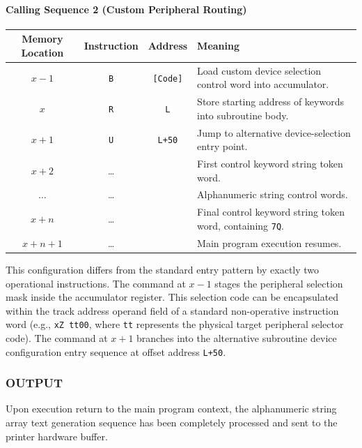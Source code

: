\paragraph{Calling Sequence 2 (Custom Peripheral Routing)}
\begin{table}[h!]
\centering
\begin{tabularx}{\textwidth}{cccX}
\toprule
\textbf{Memory Location} & \textbf{Instruction} & \textbf{Address} & \textbf{Meaning} \\
\midrule
$x-1$   & \texttt{B} & \texttt{[Code]} & Load custom device selection control word into accumulator. \\
$x$     & \texttt{R} & \texttt{L}      & Store starting address of keywords into subroutine body. \\
$x+1$   & \texttt{U} & \texttt{L+50}   & Jump to alternative device-selection entry point. \\
$x+2$   & \dots      &                  & First control keyword string token word. \\
$\dots$ & \dots      &                  & Alphanumeric string control words. \\
$x+n$   & \dots      &                  & Final control keyword string token word, containing \texttt{7Q}. \\
$x+n+1$ & \dots      &                  & Main program execution resumes. \\
\bottomrule
\end{tabularx}
\end{table}
This configuration differs from the standard entry pattern by exactly two operational instructions. The command at $x-1$ stages the peripheral selection mask inside the accumulator register. This selection code can be encapsulated within the track address operand field of a standard non-operative instruction word (e.g., \texttt{xZ tt00}, where \texttt{tt} represents the physical target peripheral selector code). The command at $x+1$ branches into the alternative subroutine device configuration entry sequence at offset address \texttt{L+50}.

\subsubsection*{OUTPUT}
Upon execution return to the main program context, the alphanumeric string array text generation sequence has been completely processed and sent to the printer hardware buffer.

